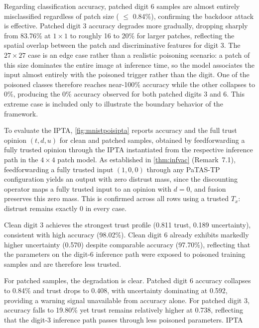 Regarding classification accuracy, patched digit 6 samples are almost entirely misclassified regardless of patch size ( $\leq$ 0.84\%), confirming the backdoor
attack is effective. Patched digit 3 accuracy degrades more gradually, dropping
sharply from 83.76\% at $1\times1$ to roughly 16 to 20\% for larger patches,
reflecting the spatial overlap between the patch and discriminative features for
digit 3. The $27\times27$ case is an edge case rather than a realistic poisoning
scenario: a patch of this size dominates the entire image at inference time, so
the model associates the input almost entirely with the poisoned trigger rather
than the digit. One of the poisoned classes therefore reaches near-100\% accuracy
while the other collapses to 0\%, producing the 0\% accuracy observed for both
patched digits 3 and 6. This extreme case is included only to illustrate the
boundary behavior of the framework.

To evaluate the \ac{IPTA}, \cref{fig:mnistpoisipta} reports accuracy and the full trust opinion $(t, d, u)$ for clean and patched samples, obtained by feedforwarding a fully trusted opinion through the \ac{IPTA} instantiated from the respective inference path in the $4\times 4$ patch model. As established in \cref{thm:infvac} (Remark~7.1), feedforwarding a fully trusted input $(1, 0, 0)$ through any \ac{PaTAS-TP} configuration yields an output with zero distrust mass, since the discounting operator maps a fully trusted input to an opinion with $d=0$, and fusion preserves this zero mass. This is confirmed across all rows using a trusted $T_x$: distrust remains exactly 0 in every case.

Clean digit 3 achieves the strongest trust profile (0.811 trust, 0.189 uncertainty), consistent with high accuracy (98.02\%). Clean digit 6 already exhibits markedly higher uncertainty (0.570) despite comparable accuracy (97.70\%), reflecting that the parameters on the digit-6 inference path were exposed to poisoned training samples and are therefore less trusted.

For patched samples, the degradation is clear. Patched digit 6 accuracy collapses to 0.84\% and trust drops to 0.408, with uncertainty dominating at 0.592, providing a warning signal unavailable from accuracy alone. For patched digit 3, accuracy falls to 19.80\% yet trust remains relatively higher at 0.738, reflecting that the digit-3 inference path passes through less poisoned parameters. \DIFaddbegin {}\ac{IPTA} \DIFaddend 

